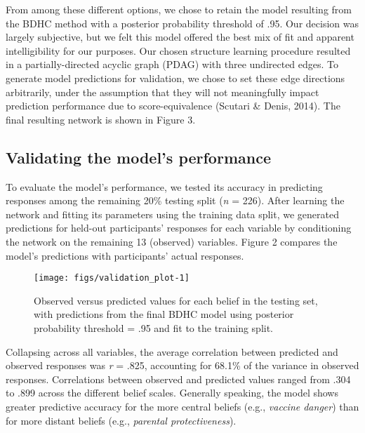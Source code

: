 \documentclass[10pt, letterpaper]{article}
\newenvironment{CodeChunk}{}{}
\begin{document}
From among these different options, we chose to retain the model
resulting from the BDHC method with a posterior probability threshold of
.95. Our decision was largely subjective, but we felt this model offered
the best mix of fit and apparent intelligibility for our purposes. Our
chosen structure learning procedure resulted in a partially-directed
acyclic graph (PDAG) with three undirected edges. To generate model
predictions for validation, we chose to set these edge directions
arbitrarily, under the assumption that they will not meaningfully impact
prediction performance due to score-equivalence (Scutari \& Denis,
2014). The final resulting network is shown in Figure 3.

\subsection{Validating the model's
performance}\label{validating-the-models-performance}

To evaluate the model's performance, we tested its accuracy in
predicting responses among the remaining 20\% testing split (\emph{n} =
226). After learning the network and fitting its parameters using the
training data split, we generated predictions for held-out participants'
responses for each variable by conditioning the network on the remaining
13 (observed) variables. Figure 2 compares the model's predictions with
participants' actual responses.

\begin{CodeChunk}
\begin{figure*}[h]

{\centering \texttt{[image: figs/validation\_plot-1]} 

}

\caption[Observed versus predicted values for each belief in the testing set, with predictions from the final BDHC model using posterior probability threshold = .95 and fit to the training split]{Observed versus predicted values for each belief in the testing set, with predictions from the final BDHC model using posterior probability threshold = .95 and fit to the training split.}\label{fig:validation_plot}
\end{figure*}
\end{CodeChunk}

Collapsing across all variables, the average correlation between
predicted and observed responses was \emph{r} = .825, accounting for
68.1\% of the variance in observed responses. Correlations between
observed and predicted values ranged from .304 to .899 across the
different belief scales. Generally speaking, the model shows greater
predictive accuracy for the more central beliefs (e.g., \emph{vaccine
danger}) than for more distant beliefs (e.g., \emph{parental
protectiveness}).
\end{document}
